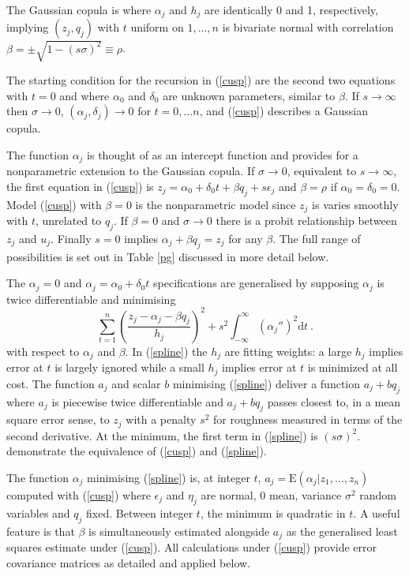 \documentclass[authoryear]{elsarticle}
\newcommand{\E}{\mathrm{E}}
\newcommand{\eps}{\epsilon}
\newcommand{\de}{\mathrm{d}}
\newcommand{\eref}[1]{(\ref{#1})}
\newcommand{\tref}[1]{Table \ref{#1}}
\newcommand{\be}[1]{\begin{equation}\label{#1}}
\newcommand{\ee}{\end{equation}}
\begin{document}
The Gaussian copula is where $\alpha_j$ and $h_j$ are  identically 0 and  1, respectively, implying  $(z_j,q_j)$ with $t$ uniform on $1,\ldots,n$  is bivariate normal  with correlation $\beta=\pm\sqrt{1-(s\sigma)^2}\equiv\rho$.    

The starting condition for the recursion in \eref{cusp} are the second two equations with $t=0$ and where $\alpha_0$ and $\delta_0$ are  unknown parameters, similar to $\beta$. If $s\rightarrow\infty$ then $\sigma\rightarrow 0$,  $(\alpha_j,\delta_j)\rightarrow 0$ for $t=0,\ldots n$, and \eref{cusp} describes a Gaussian copula.  

The function $\alpha_j$ is thought of as an intercept function and provides for a nonparametric extension to the Gaussian copula.  If $\sigma\rightarrow 0$, equivalent to $s\rightarrow\infty$,  the first equation in \eref{cusp} is
$
z_j = \alpha_0+\delta_0 t + \beta q_j + s\eps_j
$
and  $\beta=\rho$ if $\alpha_0=\delta_0=0$.    Model \eref{cusp} with  $\beta=0$ is the  nonparametric model since $z_j$ is varies smoothly with $t$, unrelated to $q_j$.  If $\beta=0$ and $\sigma\rightarrow 0$ there is a probit relationship between $z_j$ and $u_j$.  Finally $s=0$ implies $\alpha_j+\beta q_j=z_j$ for any $\beta$.   The full range of possibilities is set out in \tref{pg} discussed in more detail below.  

The $\alpha_j=0$ and $\alpha_j=\alpha_0+\delta_0 t$ specifications are generalised by supposing $\alpha_j$ is twice differentiable and minimising
\be{spline}
 \sum_{t=1}^n\left(\frac{z_j-\alpha_j-\beta q_j}{h_j}\right)^2 + s^2\int_{-\infty}^{\infty} \left(\alpha_j''\right)^2\de t\ .
\ee
with respect to $\alpha_j$ and $\beta$.
 In \eref{spline} the $h_j$  are fitting weights: a large  $h_j$ implies  error at $t$ is largely ignored while a small $h_j$ implies  error at $t$ is  minimized at all cost.  The function $a_j$ and scalar $b$ minimising \eref{spline} deliver a function $a_j+bq_j$ where $a_j$ is piecewise twice differentiable and $a_j+bq_j$ passes closest to, in a mean square error sense, to $z_j$  with a penalty $s^2$ for  roughness measured in terms of the second derivative.   At the minimum, the first term in \eref{spline} is $(s\sigma)^2$.   \cite{Brown&DeJong:2001} demonstrate the equivalence of \eref{cusp} and \eref{spline}.

The  function $\alpha_j$ minimising \eref{spline}  is, at integer $t$,  $a_j=\E(\alpha_j|z_1,\ldots,z_n)$  computed with \eref{cusp} where $\eps_j$ and $\eta_j$ are normal, 0 mean, variance $\sigma^2$ random variables and $q_j$ fixed.  Between integer $t$,  the  minimum is quadratic in $t$.  A useful feature is that $\beta$ is simultaneously estimated alongside $a_j$ as the generalised least squares estimate under \eref{cusp}.  All calculations under \eref{cusp} provide error covariance matrices as detailed and applied below.  
\end{document}
